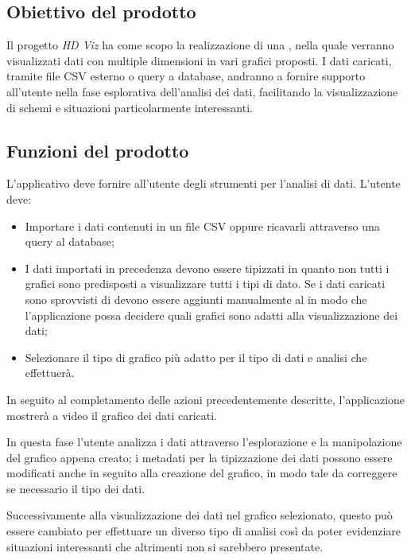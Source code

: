 \documentclass[../analisi-dei-requisiti.tex]{subfiles}
\begin{document}
\subsection{Obiettivo del prodotto}
\label{subs:obiettivo_del_prodotto}
Il progetto \emph{HD Viz} ha come scopo la realizzazione di una , nella quale verranno visualizzati dati con multiple dimensioni in vari grafici proposti.
I dati caricati, tramite file CSV esterno o query a database, andranno a fornire supporto all'utente nella fase esplorativa dell'analisi dei dati, facilitando la visualizzazione di schemi e situazioni particolarmente interessanti.


\subsection{Funzioni del prodotto}
\label{subs:funzioni_del_prodotto}
L'applicativo deve fornire all'utente degli strumenti per l'analisi di dati. L'utente deve: 
\begin{itemize}
    \item Importare i dati contenuti in un file CSV oppure ricavarli attraverso una query al database;
    \item I dati importati in precedenza devono essere tipizzati in quanto non tutti i grafici sono predisposti a visualizzare tutti i tipi di dato. Se i dati caricati sono sprovvisti di  devono essere aggiunti manualmente al  in modo che l'applicazione possa decidere quali grafici sono adatti alla visualizzazione dei dati;
    \item Selezionare il tipo di grafico più adatto per il tipo di dati e analisi che effettuerà.
\end{itemize} 

In seguito al completamento delle azioni precedentemente descritte, l'applicazione mostrerà a video il grafico dei dati caricati.


In questa fase l'utente analizza i dati attraverso l'esplorazione e la manipolazione del grafico appena creato; i metadati per la tipizzazione dei dati possono essere modificati anche in seguito alla creazione del grafico, in modo tale da correggere se necessario il tipo dei dati.


Successivamente alla visualizzazione dei dati nel grafico selezionato, questo può essere cambiato per effettuare un diverso tipo di analisi così da poter evidenziare situazioni interessanti che altrimenti non si sarebbero presentate.
\end{document}
